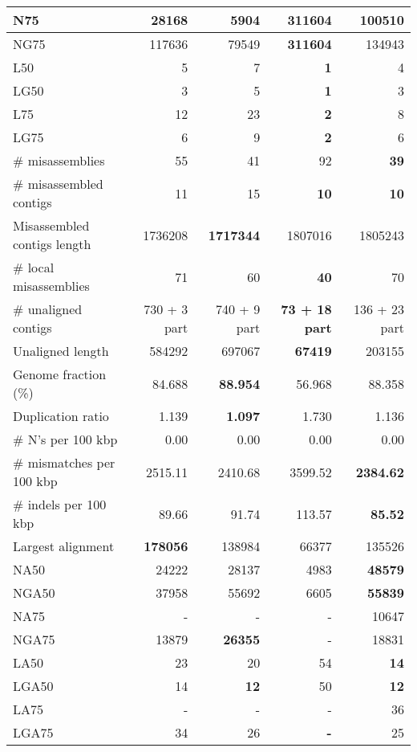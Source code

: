 \documentclass[12pt,a4paper]{article}
\begin{document}
\begin{table}[ht]
\begin{center}
\begin{tabular}{|l*{4}{|r}|}
N75 & 28168 & 5904 & {\bf 311604} & 100510 \\ \hline
NG75 & 117636 & 79549 & {\bf 311604} & 134943 \\ \hline
L50 & 5 & 7 & {\bf 1} & 4 \\ \hline
LG50 & 3 & 5 & {\bf 1} & 3 \\ \hline
L75 & 12 & 23 & {\bf 2} & 8 \\ \hline
LG75 & 6 & 9 & {\bf 2} & 6 \\ \hline
\# misassemblies & 55 & 41 & 92 & {\bf 39} \\ \hline
\# misassembled contigs & 11 & 15 & {\bf 10} & {\bf 10} \\ \hline
Misassembled contigs length & 1736208 & {\bf 1717344} & 1807016 & 1805243 \\ \hline
\# local misassemblies & 71 & 60 & {\bf 40} & 70 \\ \hline
\# unaligned contigs & 730 + 3 part & 740 + 9 part & {\bf 73 + 18 part} & 136 + 23 part \\ \hline
Unaligned length & 584292 & 697067 & {\bf 67419} & 203155 \\ \hline
Genome fraction (\%) & 84.688 & {\bf 88.954} & 56.968 & 88.358 \\ \hline
Duplication ratio & 1.139 & {\bf 1.097} & 1.730 & 1.136 \\ \hline
\# N's per 100 kbp & 0.00 & 0.00 & 0.00 & 0.00 \\ \hline
\# mismatches per 100 kbp & 2515.11 & 2410.68 & 3599.52 & {\bf 2384.62} \\ \hline
\# indels per 100 kbp & 89.66 & 91.74 & 113.57 & {\bf 85.52} \\ \hline
Largest alignment & {\bf 178056} & 138984 & 66377 & 135526 \\ \hline
NA50 & 24222 & 28137 & 4983 & {\bf 48579} \\ \hline
NGA50 & 37958 & 55692 & 6605 & {\bf 55839} \\ \hline
NA75 & - & - & - & 10647 \\ \hline
NGA75 & 13879 & {\bf 26355} & - & 18831 \\ \hline
LA50 & 23 & 20 & 54 & {\bf 14} \\ \hline
LGA50 & 14 & {\bf 12} & 50 & {\bf 12} \\ \hline
LA75 & - & - & - & 36 \\ \hline
LGA75 & 34 & 26 & {\bf -} & 25 \\ \hline
\end{tabular}
\end{center}
\end{table}
\end{document}
